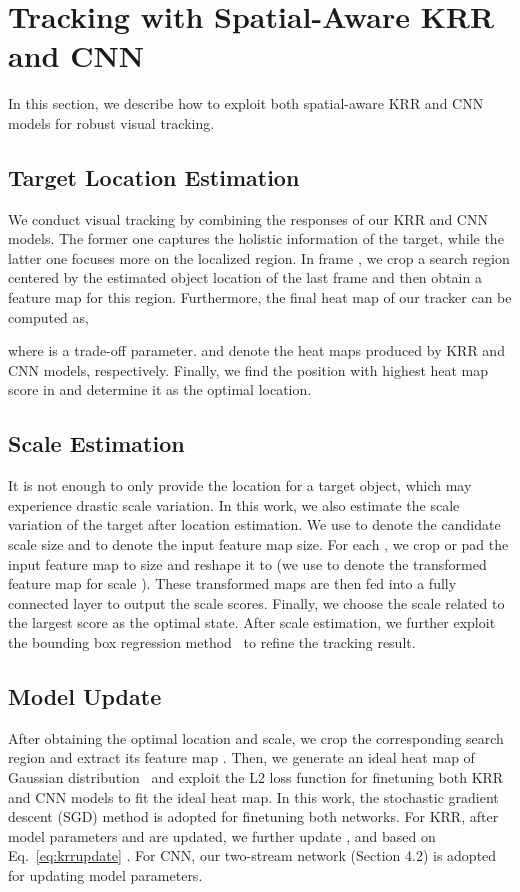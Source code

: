 \documentclass[10pt,twocolumn,letterpaper]{article}
\begin{document}
\section{Tracking with Spatial-Aware KRR and CNN}
In this section, we describe how to exploit both spatial-aware
KRR and CNN models for robust visual tracking.
\subsection{Target Location Estimation}
We conduct visual tracking by combining the responses of our KRR and CNN models. The former one
captures the holistic information of the target, while the latter one focuses more on the localized region.
In frame , we crop a search region centered by the estimated object location of the last frame
and then obtain a feature map  for this region.
Furthermore, the final heat map of our tracker can be computed as,

where  is a trade-off parameter.  and 
denote the heat maps produced by KRR and CNN models, respectively.
Finally, we find the position with highest heat map score in  and determine it as the
optimal location.
\subsection{Scale Estimation}
It is not enough to only provide the location for a target object, which may experience drastic scale variation.
In this work, we also estimate the scale variation of the target after location estimation.
We use  to denote the candidate scale size and  to denote the input feature map size.
For each , we crop or pad the input feature map to size  and reshape
it to  (we use  to denote the transformed feature map for scale ).
These transformed maps are then fed into a fully connected layer to output the scale scores. Finally, we choose
the scale related to the largest score as the optimal state. After scale estimation, we further exploit the bounding
box regression method~\cite{girshick2014rich,nam2016learning} to refine the tracking result.

\subsection{Model Update}
After obtaining the optimal location and scale, we crop the corresponding
search region and extract its feature map . Then, we generate
an ideal heat map of Gaussian distribution~\cite{henriques2015high} and
exploit the L2 loss function for finetuning both KRR and CNN models to
fit the ideal heat map. In this work, the stochastic gradient descent
(SGD) method is adopted for finetuning both networks.
For KRR, after model parameters  and  are updated, we further update
,  and  based on Eq.~\ref{eq:krrupdate} .
For CNN, our two-stream network (Section 4.2) is adopted for updating model parameters.
\end{document}
